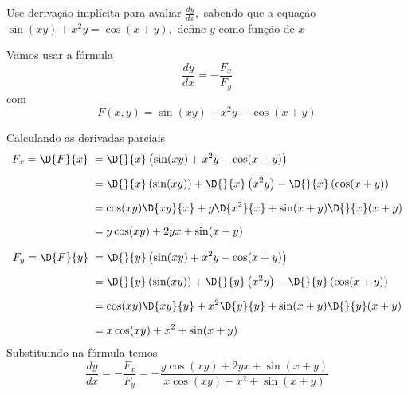 \documentclass[a4paper,12pt,fleqn]{article}
\begin{document}
Use derivação implícita para avaliar \(\frac{dy}{dx},\)
sabendo que a equação
\mbox{\(
  \sin(xy) + x^2 y = \cos(x+y),
\)}
define $y$ como função de $x$

\begin{answer}
  Vamos usar a fórmula
  \[
    \frac{dy}{dx} = - \frac{F_x}{F_y}
  \]
  com
  \[
    F(x, y) = \sin(xy) + x^2 y - \cos(x+y)
  \]

  Calculando as derivadas parciais
  \begin{align*}
    F_x = \D{F}{x} \;
    & = \D{}{x} \left(\sin(xy) + x^2 y - \cos(x+y)\right)
    \\[2mm]
    & = \D{}{x} \left(\sin(xy) \right)
      + \D{}{x} \left(x^2 y    \right)
      - \D{}{x} \left(\cos(x+y)\right)
    \\[2mm]
    & = \cos(xy)  \D{xy}{x}
      + y         \D{x^2}{x}
      + \sin(x+y) \D{}{x}(x+y)
    \\[2mm]
    & = y\cos(xy) + 2yx + \sin(x+y)
  \end{align*}

  \begin{align*}
    F_y = \D{F}{y} \;
    & = \D{}{y} \left(\sin(xy) + x^2 y - \cos(x+y)\right)
    \\[2mm]
    & = \D{}{y} \left(\sin(xy) \right)
      + \D{}{y} \left(x^2 y    \right)
      - \D{}{y} \left(\cos(x+y)\right)
    \\[2mm]
    & = \cos(xy)  \D{xy}{y}
      + x^2       \D{y}{y}
      + \sin(x+y) \D{}{y}(x+y)
    \\[2mm]
    & = x\cos(xy) + x^2 + \sin(x+y)
  \end{align*}
  Substituindo na fórmula temos
  \[
  \frac{dy}{dx}
  = - \frac{F_x}{F_y}
  = - \frac{y\cos(xy) + 2yx + \sin(x+y)}{x\cos(xy) + x^2 + \sin(x+y)}
  \]
\end{answer}

\end{document}
